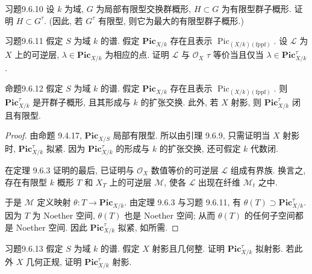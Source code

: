 \begin{origstatement}{习题}{9.6.10}\label{ch09s6:ex9610}
设 $k$ 为域, $G$ 为局部有限型交换群概形, $H\subset G$ 为有限型群子概形. 证明 $H\subset G^\tau$. (因此, 若 $G^\tau$ 有限型, 则它为最大的有限型群子概形.)
\end{origstatement}

\begin{origstatement}{习题}{9.6.11}\label{ch09s6:ex9611}
假定 $S$ 为域 $k$ 的谱. 假定 $\mathbf{Pic}_{X/k}$ 存在且表示 $\operatorname{Pic}_{(X/k)(\mathrm{fppf})}$. 设 $\mathcal L$ 为 $X$ 上的可逆层, $\lambda\in\mathbf{Pic}_{X/k}$ 为相应的点. 证明 $\mathcal L$ 与 $\mathcal O_X$ $\tau$ 等价当且仅当 $\lambda\in\mathbf{Pic}_{X/k}^{\tau}$.
\end{origstatement}

\begin{origstatement}{命题}{9.6.12}\label{ch09s6:prop9612}
假定 $S$ 为域 $k$ 的谱. 假定 $\mathbf{Pic}_{X/k}$ 存在且表示 $\operatorname{Pic}_{(X/k)(\mathrm{fppf})}$. 则 $\mathbf{Pic}_{X/k}^{\tau}$ 是开群子概形, 且其形成与 $k$ 的扩张交换. 此外, 若 $X$ 射影, 则 $\mathbf{Pic}_{X/k}^{\tau}$ 闭且有限型.
\end{origstatement}
\begin{proof}
由命题 9.4.17, $\mathbf{Pic}_{X/S}$ 局部有限型. 所以由引理 9.6.9, 只需证明当 $X$ 射影时, $\mathbf{Pic}_{X/k}^{\tau}$ 拟紧. 因为 $\mathbf{Pic}_{X/k}^{\tau}$ 的形成与 $k$ 的扩张交换, 还可假定 $k$ 代数闭.

在定理 9.6.3 证明的最后, 已证明与 $\mathcal O_X$ 数值等价的可逆层 $\mathcal L$ 组成有界族. 换言之, 存在有限型 $k$ 概形 $T$ 和 $X_T$ 上的可逆层 $\mathcal M$, 使各 $\mathcal L$ 出现在纤维 $\mathcal M_t$ 之中.

于是 $\mathcal M$ 定义映射 $\theta:T\to\mathbf{Pic}_{X/k}$. 由定理 9.6.3 与习题 9.6.11, 有 $\theta(T)\supset\mathbf{Pic}_{X/k}^{\tau}$. 因为 $T$ 为 Noether 空间, $\theta(T)$ 也是 Noether 空间; 从而 $\theta(T)$ 的任何子空间都是 Noether 空间. 因此 $\mathbf{Pic}_{X/k}^{\tau}$ 拟紧, 如所需.
\end{proof}

\begin{origstatement}{习题}{9.6.13}\label{ch09s6:ex9613}
假定 $S$ 为域 $k$ 的谱. 假定 $X$ 射影且几何整. 证明 $\mathbf{Pic}_{X/k}^{\tau}$ 拟射影. 若此外 $X$ 几何正规, 证明 $\mathbf{Pic}_{X/k}^{\tau}$ 射影.
\end{origstatement}

